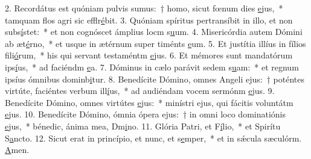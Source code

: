 2. Recordátus est quóniam pulvis sumus:~† homo, sicut fœnum dies \uline{e}jus,~* tamquam flos agri sic efflr\uline{é}bit.
3. Quóniam spíritus pertransíbit in illo, et non subs\uline{í}stet:~* et non cognóscet ámplius locm s\uline{u}um.
4. Misericórdia autem Dómini ab æt\uline{é}rno,~* et usque in ætérnum super timénts \uline{e}um.
5. Et justítia illíus in fílios fili\uline{ó}rum,~* his qui servant testaméntm \uline{e}jus.
6. Et mémores sunt mandatórum ips\uline{í}us,~* ad faciéndm \uline{e}a.
7. Dóminus in cælo parávit sedem s\uline{u}am:~* et regnum ipsíus ómnibus dominb\uline{i}tur.
8. Benedícite Dómino, omnes Angeli ejus:~† poténtes virtúte, faciéntes verbum ill\uline{í}us,~* ad audiéndam vocem sermónm \uline{e}jus.
9. Benedícite Dómino, omnes virtútes \uline{e}jus:~* minístri ejus, qui fácitis voluntátm \uline{e}jus.
10. Benedícite Dómino, ómnia ópera ejus:~† in omni loco dominatiónis \uline{e}jus,~* bénedic, ánima mea, Dm\uline{i}no.
11. Glória Patri, et F\uline{í}lio,~* et Spirítu S\uline{a}ncto.
12. Sicut erat in princípio, et nunc, et s\uline{e}mper,~* et in sǽcula sæculórm. \uline{A}men.
